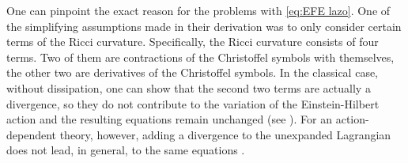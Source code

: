 \documentclass[../main.tex]{subfiles}
\begin{document}
One can pinpoint the exact reason for the problems with \cref{eq:EFE lazo}. One of the
simplifying assumptions made in their derivation was to only consider certain terms of the Ricci curvature.
Specifically, the Ricci curvature consists of four terms. Two of them are contractions of
the Christoffel symbols with themselves, the other two are derivatives of the Christoffel
symbols. In the classical case, without dissipation, one can show that the second two terms are actually a divergence, so they do not contribute to the variation of the Einstein-Hilbert action and the resulting equations remain unchanged (see \cite{Gaset2018,Maria2015}). For an action-dependent theory, however, adding a divergence to the unexpanded Lagrangian does not lead, in general, to the same equations \cite{inverse,Lazo2021}. 
\end{document}
